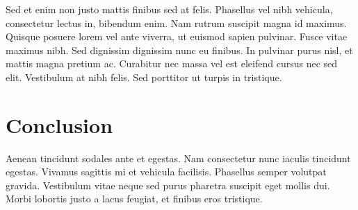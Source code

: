 \documentclass[9pt]{IEEEtran}
\begin{document}
Sed et enim non justo mattis finibus sed at felis. Phasellus vel nibh vehicula, consectetur lectus in, bibendum enim. Nam rutrum suscipit magna id maximus. Quisque posuere lorem vel ante viverra, ut euismod sapien pulvinar. Fusce vitae maximus nibh. Sed dignissim dignissim nunc eu finibus. In pulvinar purus nisl, et mattis magna pretium ac. Curabitur nec massa vel est eleifend cursus nec sed elit. Vestibulum at nibh felis. Sed porttitor ut turpis in tristique.

 \section{Conclusion}

Aenean tincidunt sodales ante et egestas. Nam consectetur nunc iaculis tincidunt egestas. Vivamus sagittis mi et vehicula facilisis. Phasellus semper volutpat gravida. Vestibulum vitae neque sed purus pharetra suscipit eget mollis dui. Morbi lobortis justo a lacus feugiat, et finibus eros tristique.



\end{document}
